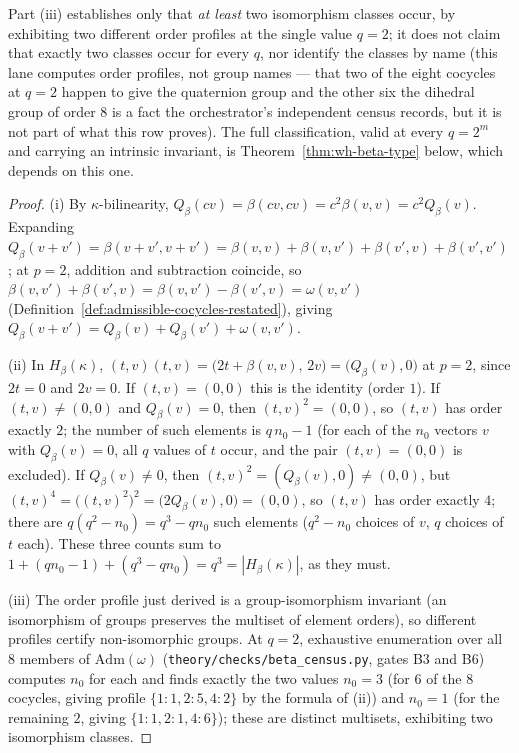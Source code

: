 \begin{scope}
Part (iii) establishes only that \emph{at least} two isomorphism classes
occur, by exhibiting two different order profiles at the single value $q=2$;
it does not claim that exactly two classes occur for every $q$, nor identify
the classes by name (this lane computes order profiles, not group names —
that two of the eight cocycles at $q=2$ happen to give the quaternion group
and the other six the dihedral group of order $8$ is a fact the
orchestrator's independent census records, but it is not part of what this
row proves). The full classification, valid at every $q=2^m$ and carrying an
intrinsic invariant, is Theorem~\ref{thm:wh-beta-type} below, which depends
on this one.
\end{scope}


\begin{proof}
(i) By $\kappa$-bilinearity, $Q_\beta(cv)=\beta(cv,cv)=c^2\beta(v,v)=c^2Q_\beta(v)$.
Expanding $Q_\beta(v+v')=\beta(v+v',v+v')=\beta(v,v)+\beta(v,v')+\beta(v',v)+\beta(v',v')$;
at $p=2$, addition and subtraction coincide, so
$\beta(v,v')+\beta(v',v)=\beta(v,v')-\beta(v',v)=\omega(v,v')$
(Definition~\ref{def:admissible-cocycles-restated}), giving
$Q_\beta(v+v')=Q_\beta(v)+Q_\beta(v')+\omega(v,v')$.

(ii) In $H_\beta(\kappa)$, $(t,v)(t,v)=\big(2t+\beta(v,v),\,2v\big)=\big(Q_\beta(v),0\big)$
at $p=2$, since $2t=0$ and $2v=0$. If $(t,v)=(0,0)$ this is the identity
(order $1$). If $(t,v)\neq(0,0)$ and $Q_\beta(v)=0$, then $(t,v)^2=(0,0)$, so
$(t,v)$ has order exactly $2$; the number of such elements is
$q\,n_0 - 1$ (for each of the $n_0$ vectors $v$ with $Q_\beta(v)=0$, all $q$
values of $t$ occur, and the pair $(t,v)=(0,0)$ is excluded). If
$Q_\beta(v)\neq 0$, then $(t,v)^2=(Q_\beta(v),0)\neq(0,0)$, but
$(t,v)^4=\big((t,v)^2\big)^2=\big(2Q_\beta(v),0\big)=(0,0)$, so $(t,v)$ has
order exactly $4$; there are $q(q^2-n_0)=q^3-qn_0$ such elements ($q^2-n_0$
choices of $v$, $q$ choices of $t$ each). These three counts sum to
$1+(qn_0-1)+(q^3-qn_0)=q^3=|H_\beta(\kappa)|$, as they must.

(iii) The order profile just derived is a group-isomorphism invariant (an
isomorphism of groups preserves the multiset of element orders), so
different profiles certify non-isomorphic groups. At $q=2$, exhaustive
enumeration over all $8$ members of $\mathrm{Adm}(\omega)$
(\texttt{theory\slash{}checks\slash{}beta\_census.py}, gates B3 and B6) computes $n_0$ for
each and finds exactly the two values $n_0=3$ (for $6$ of the $8$ cocycles,
giving profile $\{1{:}1,2{:}5,4{:}2\}$ by the formula of (ii)) and $n_0=1$
(for the remaining $2$, giving $\{1{:}1,2{:}1,4{:}6\}$); these are distinct
multisets, exhibiting two isomorphism classes.
\end{proof}

